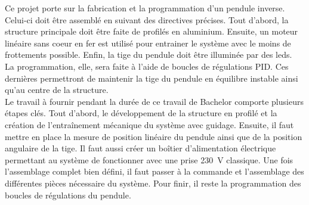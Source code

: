 Ce projet porte sur la fabrication et la programmation d'un pendule inverse. Celui-ci doit être assemblé en suivant des directives précises.
Tout d'abord, la structure principale doit être faite de profilés en aluminium. Ensuite, un moteur linéaire sans coeur en fer est utilisé pour
entrainer le système avec le moins de frottements possible. Enfin, la tige du pendule doit être illuminée par des leds.\\

La programmation, elle, sera faite à l'aide de boucles de régulations \gls{PID}. Ces dernières permettront de maintenir la tige du pendule
en équilibre instable ainsi qu'au centre de la structure.\\

Le travail à fournir pendant la durée de ce travail de Bachelor comporte plusieurs étapes clés. Tout d'abord, le développement de la structure
en profilé et la création de l'entraînement mécanique du système avec guidage. Ensuite, il faut mettre en place la mesure de position linéaire
du pendule ainsi que de la position angulaire de la tige. Il faut aussi créer un boîtier d'alimentation électrique permettant au système de
fonctionner avec une prise 230~V classique. Une fois l'assemblage complet bien défini, il faut passer à la commande et l'assemblage des
différentes pièces nécessaire du système. Pour finir, il reste la programmation des boucles de régulations du pendule.